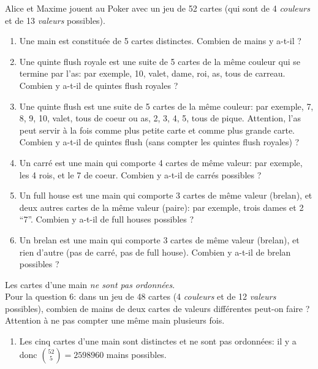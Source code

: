\begin{exo} 
Alice et Maxime jouent au Poker avec un jeu de 52 cartes (qui sont de 4 \emph{couleurs} et de 13 \emph{valeurs} possibles). 
\begin{enumerate}
\item Une \og{}main\fg{} est constituée de 5 cartes distinctes. Combien de mains y a-t-il ? 
\item Une \og{}quinte flush royale\fg{} est une suite de 5 cartes de la même couleur qui se termine par l'as: par exemple, \og{}10, valet, dame, roi, as, tous de carreau\fg{}. Combien y a-t-il de quintes flush royales ?
\item Une \og{}quinte flush\fg{} est une suite de 5 cartes de la même couleur: par exemple,  \og{}7, 8, 9, 10, valet, tous de coeur\fg{} ou \og{}as, 2, 3, 4, 5,  tous de pique\fg{}. Attention, l'as peut servir à la fois comme plus petite carte et comme plus grande carte. Combien y a-t-il de quintes flush (sans compter les quintes flush royales) ?
\item Un \og{}carré\fg{} est une main qui comporte 4 cartes de même valeur: par exemple,  \og{}les 4 rois, et le 7 de coeur\fg{}. Combien y a-t-il de carrés possibles ?
\item Un  \og{}full house\fg{} est une main qui comporte 3 cartes de même valeur (brelan), et deux autres cartes de la même valeur (paire): par exemple,  trois dames et 2 ``7''. Combien y a-t-il de full houses possibles ?
\item Un  \og{}brelan\fg{} est une main qui comporte 3 cartes de même valeur (brelan), et rien d'autre (pas de carré, pas de full house). Combien y a-t-il de brelan possibles ?
\end{enumerate}

\begin{hint} %
Les cartes d'une main \emph{ne sont pas ordonnées}.\\
Pour la question 6: dans un jeu de 48 cartes (4 \emph{couleurs} et de 12 \emph{valeurs} possibles), combien de mains de deux cartes de valeurs différentes peut-on faire ? Attention à ne pas compter une même main plusieurs fois.
\end{hint}

\begin{sol} %
\begin{enumerate}
\item Les cinq cartes d'une main sont distinctes et ne sont pas ordonnées: il y a donc $\binom{52}{5}=2598960$ mains possibles. 


\end{enumerate}
\end{sol}
\end{exo}
